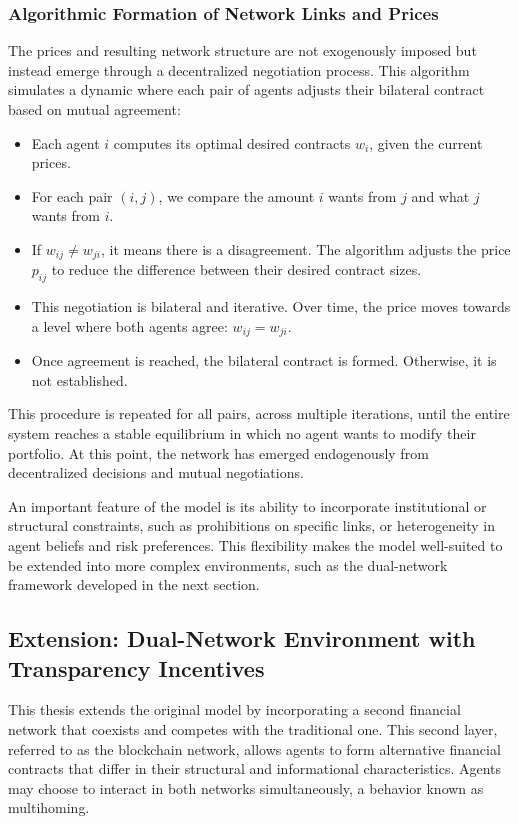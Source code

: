 \subsubsection{Algorithmic Formation of Network Links and Prices}

The prices and resulting network structure are not exogenously imposed but instead emerge through a decentralized negotiation process. This algorithm simulates a dynamic where each pair of agents adjusts their bilateral contract based on mutual agreement:

\begin{itemize}
    \item Each agent \( i \) computes its optimal desired contracts \( w_i \), given the current prices.
    \item For each pair \( (i,j) \), we compare the amount \( i \) wants from \( j \) and what \( j \) wants from \( i \).
    \item If \( w_{ij} \ne w_{ji} \), it means there is a disagreement. The algorithm adjusts the price \( p_{ij} \) to reduce the difference between their desired contract sizes.
    \item This negotiation is bilateral and iterative. Over time, the price moves towards a level where both agents agree: \( w_{ij} = w_{ji} \).
    \item Once agreement is reached, the bilateral contract is formed. Otherwise, it is not established.
\end{itemize}

This procedure is repeated for all pairs, across multiple iterations, until the entire system reaches a stable equilibrium in which no agent wants to modify their portfolio. At this point, the network has emerged endogenously from decentralized decisions and mutual negotiations.

An important feature of the model is its ability to incorporate institutional or structural constraints, such as prohibitions on specific links, or heterogeneity in agent beliefs and risk preferences. This flexibility makes the model well-suited to be extended into more complex environments, such as the dual-network framework developed in the next section.


\subsection{Extension: Dual-Network Environment with Transparency Incentives}

This thesis extends the original model by incorporating a second financial network that coexists and competes with the traditional one. This second layer, referred to as the blockchain network, allows agents to form alternative financial contracts that differ in their structural and informational characteristics. Agents may choose to interact in both networks simultaneously, a behavior known as multihoming.

